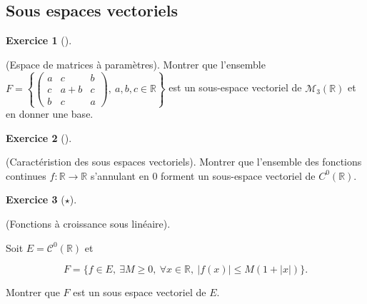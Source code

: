 \documentclass[
  french,
  letterpaper,
  DIV=11,
  numbers=noendperiod]{scrreprt}
\theoremstyle{plain}
\theoremstyle{definition}
\theoremstyle{plain}
\theoremstyle{plain}
\theoremstyle{definition}
\newtheorem{exercise}{Exercice}[chapter]
\theoremstyle{definition}
\theoremstyle{plain}
\theoremstyle{remark}
\begin{document}
\subsection{Sous espaces vectoriels}\label{sous-espaces-vectoriels-1}

\begin{exercise}[]\protect\hypertarget{exr-03-vect}{}\label{exr-03-vect}

(Espace de matrices à paramètres). Montrer que l'ensemble
\(F = \left\{\begin{pmatrix}
a&c&b\\
c&a+b&c\\
b&c&a
\end{pmatrix},\ a,b,c\in\mathbb{R}\right\}\) est un sous-espace
vectoriel de \(\mathcal{M}_3(\mathbb{R})\) et en donner une base.

\end{exercise}

\begin{exercise}[]\protect\hypertarget{exr-03-sev-carac-1}{}\label{exr-03-sev-carac-1}

(Caractéristion des sous espaces vectoriels). Montrer que l'ensemble des
fonctions continues \(f:\mathbb{R} \to \mathbb{R}\) s'annulant en \(0\)
forment un sous-espace vectoriel de \(C^{0}(\mathbb{R})\).

\end{exercise}

\begin{exercise}[\(\star\)]\protect\hypertarget{exr-03-sev-carac-2}{}\label{exr-03-sev-carac-2}

(Fonctions à croissance sous linéaire).

Soit \(E = \mathcal{C}^{0}(\mathbb{R})\) et

\[
    F=\{f \in E,\ \exists M \geqslant 0,\ \forall x \in \mathbb{R},\ |f(x)|\leqslant M(1+|x|)\}.
\]

Montrer que \(F\) est un sous espace vectoriel de \(E\).

\end{exercise}
\end{document}
